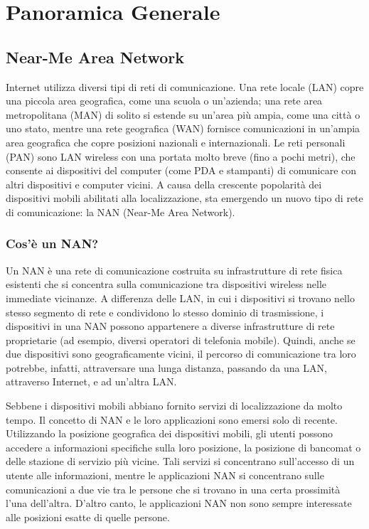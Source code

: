 \chapter{Panoramica Generale}


\section{Near-Me Area Network}

Internet utilizza diversi tipi di reti di comunicazione. Una rete
locale (LAN) copre una piccola area geografica, come una scuola o
un'azienda; una rete area metropolitana (MAN) di solito si estende su
un'area più ampia, come una città o uno stato, mentre una rete geografica
(WAN) fornisce comunicazioni in un'ampia area geografica che copre posizioni
nazionali e internazionali. Le reti personali (PAN) sono LAN wireless con una
portata molto breve (fino a pochi metri), che consente ai dispositivi del
computer (come PDA e stampanti) di comunicare con altri dispositivi e computer
vicini. A causa della crescente popolarità dei dispositivi mobili abilitati
alla localizzazione, sta emergendo un nuovo tipo di rete di comunicazione: la
NAN (Near-Me Area Network).
\subsection{Cos'è un NAN?}
Un NAN è una rete di comunicazione costruita su infrastrutture di rete
fisica esistenti che si concentra sulla comunicazione tra dispositivi wireless
nelle immediate vicinanze. A differenza delle LAN, in cui i dispositivi si
trovano nello stesso segmento di rete e condividono lo stesso dominio di
trasmissione, i dispositivi in ​​una NAN possono appartenere a diverse
infrastrutture di rete proprietarie (ad esempio, diversi operatori di telefonia
mobile). Quindi, anche se due dispositivi sono geograficamente vicini, il
percorso di comunicazione tra loro potrebbe, infatti, attraversare una lunga
distanza, passando da una LAN, attraverso Internet, e ad un'altra LAN.

Sebbene i dispositivi mobili abbiano fornito servizi di localizzazione da
molto tempo. Il concetto di NAN e le loro applicazioni sono emersi solo di
recente. Utilizzando la
posizione geografica dei dispositivi mobili, gli utenti possono accedere a
informazioni specifiche sulla loro posizione, la posizione di bancomat o delle
stazione di
servizio più vicine. Tali servizi si concentrano sull'accesso di un utente alle
informazioni, mentre le applicazioni NAN si concentrano sulle comunicazioni a
due vie tra le persone che si trovano in una certa prossimità l'una dell'altra.
D'altro canto, le applicazioni NAN non sono sempre interessate alle posizioni
esatte di quelle persone.



